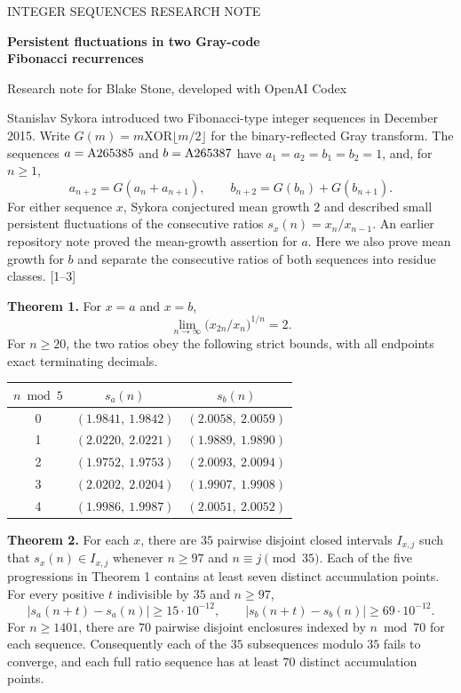 \documentclass[11pt,letterpaper]{article}
\newcommand{\A}{\textnormal{A265385}}
\newcommand{\B}{\textnormal{A265387}}
\begin{document}
{\small\sffamily\color{accent} INTEGER SEQUENCES \hfill RESEARCH NOTE}\par
{\LARGE\bfseries Persistent fluctuations in two Gray-code\\[2pt] Fibonacci recurrences}\par
{\small Research note for Blake Stone, developed with OpenAI Codex}\par
\medskip
Stanislav Sykora introduced two Fibonacci-type integer sequences in December 2015.
Write $G(m)=m\mathbin{\mathrm{XOR}}\lfloor m/2\rfloor$ for the binary-reflected Gray transform.
The sequences $a=\A$ and $b=\B$ have $a_1=a_2=b_1=b_2=1$, and, for $n\ge1$,
\[
 a_{n+2}=G(a_n+a_{n+1}),\qquad b_{n+2}=G(b_n)+G(b_{n+1}).
\]
For either sequence $x$, Sykora conjectured mean growth $2$ and described small persistent fluctuations of the consecutive ratios $s_x(n)=x_n/x_{n-1}$.
An earlier repository note proved the mean-growth assertion for $a$.
Here we also prove mean growth for $b$ and separate the consecutive ratios of both sequences into residue classes. [1--3]

\textbf{Theorem 1.} For $x=a$ and $x=b$,
\[
 \lim_{n\to\infty}\bigl(x_{2n}/x_n\bigr)^{1/n}=2.
\]
For $n\ge20$, the two ratios obey the following strict bounds, with all endpoints exact terminating decimals.
\begin{center}
\begin{tabular}{ccc}\toprule
$n\bmod5$ & $s_a(n)$ & $s_b(n)$\\\midrule
0 & $(1.9841,\ 1.9842)$ & $(2.0058,\ 2.0059)$\\
1 & $(2.0220,\ 2.0221)$ & $(1.9889,\ 1.9890)$\\
2 & $(1.9752,\ 1.9753)$ & $(2.0093,\ 2.0094)$\\
3 & $(2.0202,\ 2.0204)$ & $(1.9907,\ 1.9908)$\\
4 & $(1.9986,\ 1.9987)$ & $(2.0051,\ 2.0052)$\\\bottomrule
\end{tabular}
\end{center}
\textbf{Theorem 2.} For each $x$, there are $35$ pairwise disjoint closed intervals $I_{x,j}$ such that $s_x(n)\in I_{x,j}$ whenever $n\ge97$ and $n\equiv j\pmod{35}$. Each of the five progressions in Theorem 1 contains at least seven distinct accumulation points. For every positive $t$ indivisible by $35$ and $n\ge97$,
\[
 |s_a(n+t)-s_a(n)|\ge15\cdot10^{-12},\qquad
 |s_b(n+t)-s_b(n)|\ge69\cdot10^{-12}.
\]
For $n\ge1401$, there are $70$ pairwise disjoint enclosures indexed by $n\bmod70$ for each sequence. Consequently each of the $35$ subsequences modulo $35$ fails to converge, and each full ratio sequence has at least $70$ distinct accumulation points.
\end{document}
